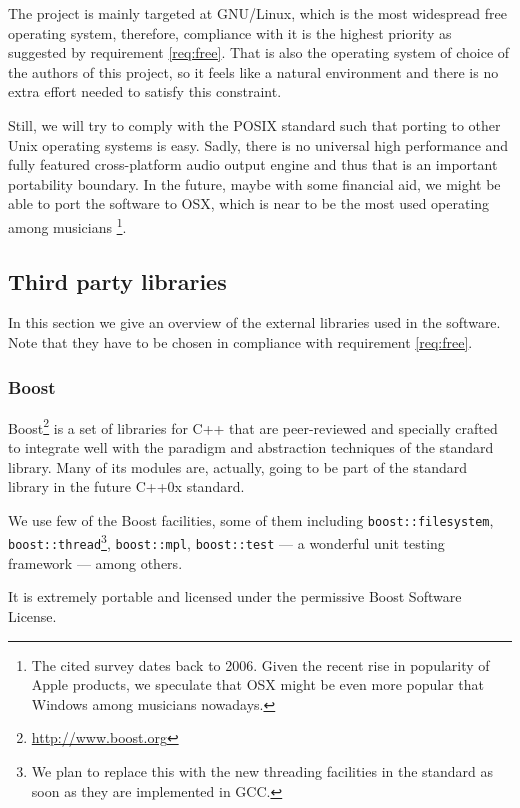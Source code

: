The project is mainly targeted at GNU/Linux, which is
the most widespread free operating system, therefore, compliance with
it is the highest priority as suggested by requirement
\ref{req:free}. That is also the operating system of choice of the
authors of this project, so it feels like a natural environment and
there is no extra effort needed to satisfy this constraint.

Still, we will try to comply with the POSIX standard
\cite{2008posix} such that porting to other Unix operating systems is
easy. Sadly, there is no universal high performance and fully featured
cross-platform audio output engine and thus that is an important
portability boundary. In the future, maybe with some financial aid, we
might be able to port the software to OSX, which is near to be the
most used operating among musicians
\cite{magnusson07acoustic}\footnote{The cited survey dates back to
  2006. Given the recent rise in popularity of Apple products, we
  speculate that OSX might be even more popular that Windows among
  musicians nowadays.}.

\subsection{Third party libraries}

In this section we give an overview of the external libraries used in
the software. Note that they have to be chosen in compliance with
requirement \ref{req:free}.

\subsubsection{Boost}

Boost\footnote{\url{http://www.boost.org}} is a
set of libraries for C++ that are peer-reviewed and specially crafted
to integrate well with the paradigm and abstraction techniques of the
standard library. Many of its modules are, actually, going to be part
of the standard library in the future C++0x standard.

We use few of the Boost facilities, some of them including
\texttt{boost::file\-system}, \texttt{boost::thread}\footnote{We plan
  to replace this with the new threading facilities in the standard as
  soon as they are implemented in GCC.}, \texttt{boost::mpl},
\texttt{boost::test} --- a wonderful unit testing framework --- among
others.

It is extremely portable and licensed under the permissive Boost
Software License.

